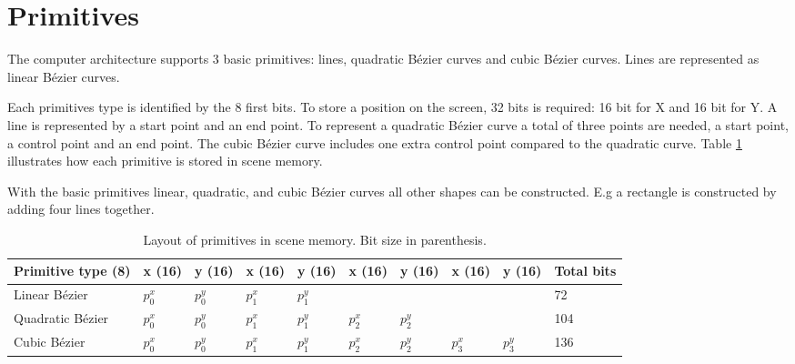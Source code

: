 \section{Primitives}

The computer architecture supports 3 basic primitives: lines, quadratic Bézier curves and cubic Bézier curves.
Lines are represented as linear Bézier curves.

Each primitives type is identified by the 8 first bits.
To store a position on the screen, 32 bits is required: 16 bit for X and 16 bit for Y.
A line is represented by a start point and an end point.
To represent a quadratic Bézier curve a total of three points are needed, a start point, a control point and an end point.
The cubic Bézier curve includes one extra control point compared to the quadratic curve.
Table \ref{tbl:primitives} illustrates how each primitive is stored in scene memory.

With the basic primitives linear, quadratic, and cubic Bézier curves all other shapes can be constructed.
E.g a rectangle is constructed by adding four lines together.

\begin{table}[h]
    \centering
    \begin{tabular}{|l|l|l|l|l|l|l|l|l|l|}
    \hline
    Primitive type (8) & x (16) & y (16) & x (16) & y (16) & x (16) & y (16) & x (16) & y (16) & Total bits \\ \hline
    Linear Bézier    & \(p_0^x \) & \(p_0^y \) & \(p_1^x \) & \(p_1^y \) & ~   & ~   & ~   & ~   & 72    \\ \hline
    Quadratic Bézier & \(p_0^x \) & \(p_0^y \) & \(p_1^x \) & \(p_1^y \) & \(p_2^x \) & \(p_2^y \) & ~   & ~   & 104   \\ \hline
    Cubic Bézier     & \(p_0^x \) & \(p_0^y \) & \(p_1^x \) & \(p_1^y \) & \(p_2^x \) & \(p_2^y \) & \(p_3^x \) & \(p_3^y \) & 136   \\ \hline
    \end{tabular}
    \caption{Layout of primitives in scene memory. Bit size in parenthesis.}
	\label{tbl:primitives}
\end{table}